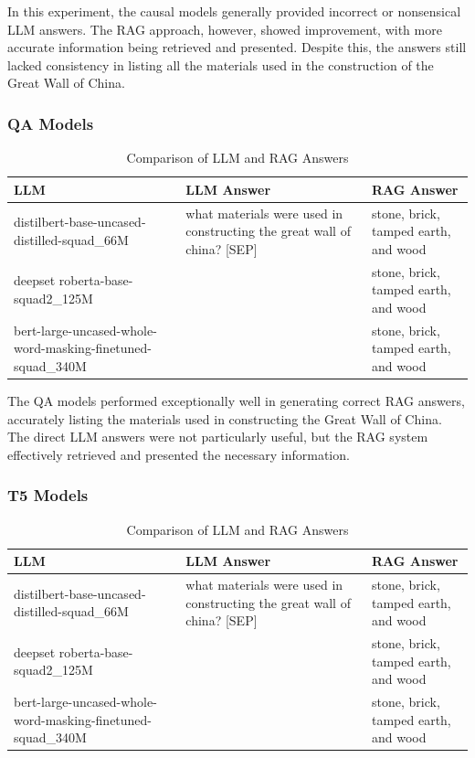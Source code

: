 \documentclass{wseas}
\begin{document}
In this experiment, the causal models generally provided incorrect or
nonsensical LLM answers. The RAG approach, however, showed improvement,
with more accurate information being retrieved and presented. Despite
this, the answers still lacked consistency in listing all the materials
used in the construction of the Great Wall of China.

\subsubsection{QA Models}

\begin{table}[htbp]
  \centering
  \caption{Comparison of LLM and RAG Answers}
  \begin{tabular}{|p{0.3714\linewidth}|p{0.4000\linewidth}|p{0.2286\linewidth}|}
    \hline
    \textbf{LLM} & \textbf{LLM Answer} & \textbf{RAG Answer} \\
    \hline
    distilbert-base-uncased-distilled-squad\_66M & what materials were used in constructing the great wall of china? {[}SEP{]} & stone, brick, tamped earth, and wood \\
    \hline
    deepset roberta-base-squad2\_125M & & stone, brick, tamped earth, and wood \\
    \hline
    bert-large-uncased-whole-word-masking-finetuned-squad\_340M & & stone, brick, tamped earth, and wood \\
    \hline
  \end{tabular}
\end{table}
  

The QA models performed exceptionally well in generating correct RAG
answers, accurately listing the materials used in constructing the Great
Wall of China. The direct LLM answers were not particularly useful, but
the RAG system effectively retrieved and presented the necessary
information.

\subsubsection{T5 Models}

\begin{table}[htbp]
  \centering
  \caption{Comparison of LLM and RAG Answers} %
  \begin{tabular}{|p{0.3714\linewidth}|p{0.4000\linewidth}|p{0.2286\linewidth}|}
    \hline
    \textbf{LLM} & \textbf{LLM Answer} & \textbf{RAG Answer} \\
    \hline
    distilbert-base-uncased-distilled-squad\_66M & what materials were used in constructing the great wall of china? {[}SEP{]} & stone, brick, tamped earth, and wood \\
    \hline
    deepset roberta-base-squad2\_125M & & stone, brick, tamped earth, and wood \\
    \hline
    bert-large-uncased-whole-word-masking-finetuned-squad\_340M & & stone, brick, tamped earth, and wood \\
    \hline
  \end{tabular}
\end{table}
\end{document}
